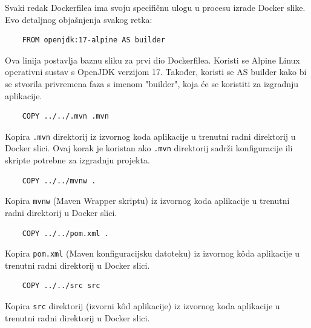 			\noindent Svaki redak Dockerfilea ima svoju specifičnu ulogu u procesu izrade Docker slike. Evo detaljnog objašnjenja svakog retka:
			
			\begin{packed_enum}
				\item 
\begin{lstlisting}
	FROM openjdk:17-alpine AS builder
\end{lstlisting}

			Ova linija postavlja baznu sliku za prvi dio Dockerfilea. Koristi se Alpine Linux operativni sustav s OpenJDK verzijom 17. Također, koristi se AS builder kako bi se stvorila privremena faza s imenom "builder", koja će se koristiti za izgradnju aplikacije.
			
			\item 
\begin{lstlisting}
	COPY ../../.mvn .mvn
\end{lstlisting}
			
			Kopira \texttt{.mvn} direktorij iz izvornog koda aplikacije u trenutni radni direktorij u Docker slici. Ovaj korak je koristan ako \texttt{.mvn} direktorij sadrži konfiguracije ili skripte potrebne za izgradnju projekta.
			
			\item 
\begin{lstlisting}
	COPY ../../mvnw .
\end{lstlisting}

			Kopira \texttt{mvnw} (Maven Wrapper skriptu) iz izvornog koda aplikacije u trenutni radni direktorij u Docker slici.
			
			\item

\begin{lstlisting}
	COPY ../../pom.xml .
\end{lstlisting}

			Kopira \texttt{pom.xml} (Maven konfiguracijsku datoteku) iz izvornog kôda aplikacije u trenutni radni direktorij u Docker slici.
			
			\item 

\begin{lstlisting}
	COPY ../../src src
\end{lstlisting}

			Kopira \texttt{src} direktorij (izvorni kôd aplikacije) iz izvornog koda aplikacije u trenutni radni direktorij u Docker slici.
			
			
			\item 
			

\end{packed_enum}
